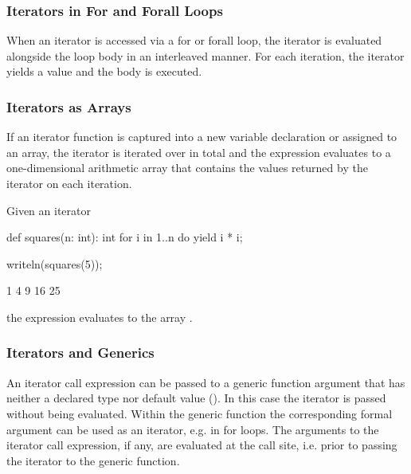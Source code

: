 \subsubsection{Iterators in For and Forall Loops}
\label{Iterators_in_For_and_Forall_Loops}

When an iterator is accessed via a for or forall loop, the iterator is
evaluated alongside the loop body in an interleaved manner.  For each
iteration, the iterator yields a value and the body is executed.

\subsubsection{Iterators as Arrays}
\label{Iterators_as_Arrays}

If an iterator function is captured into a new variable declaration or
assigned to an array, the iterator is iterated over in total and the
expression evaluates to a one-dimensional arithmetic array that
contains the values returned by the iterator on each iteration.
\begin{example}
Given an iterator
\begin{chapel}
def squares(n: int): int {
  for i in 1..n do
    yield i * i;
}
\end{chapel}
\begin{chapelpost}
writeln(squares(5));
\end{chapelpost}
\begin{chapeloutput}
1 4 9 16 25
\end{chapeloutput}
the expression  evaluates to the array .
\end{example}

\subsubsection{Iterators and Generics}
\label{Iterators_and_Generics}

An iterator call expression can be passed to a generic function argument that
has neither a declared type nor default value
().
In this case the iterator is passed without being evaluated.
Within the generic function the corresponding formal argument
can be used as an iterator, e.g. in for loops.
The arguments to the iterator call expression, if any, are evaluated
at the call site, i.e. prior to passing the iterator to the generic function.

